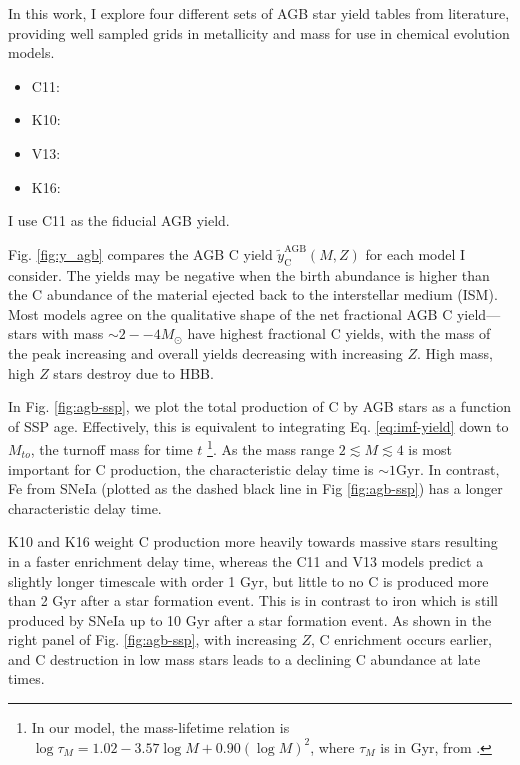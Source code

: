 \documentclass[12pt,oneside]{report}
\begin{document}
In this work, I explore four different sets of AGB star yield tables from literature, providing well sampled grids in metallicity and mass for use in chemical evolution models. 
\begin{itemize}
    \item C11: \citet{cristallo+11, cristallo+15}
    \item K10: \citet{karakas10}
    \item V13: \citet{ventura+13,ventura+14,ventura+18}
    \item K16: \citet{KL16} \citet{karakas+18}
\end{itemize}
I use C11 as the fiducial AGB yield.


Fig. \ref{fig:y_agb} compares the AGB C yield $\tilde{y}_\text{C}^\text{AGB}(M, Z)$ for each model I consider. 
The yields may be negative when the birth abundance is higher than the C abundance of the material ejected back to the interstellar medium (ISM). 
Most models agree on the qualitative shape of the net fractional AGB C yield---%
stars with mass $\sim 2--4 M_\odot$ have highest fractional C yields, with the mass of the peak increasing and overall yields decreasing with increasing $Z$.  High mass, high $Z$ stars destroy  due to HBB.

In Fig. \ref{fig:agb-ssp}, we plot the total production of C by AGB stars as a function of SSP age.
Effectively, this is equivalent to integrating Eq. \ref{eq:imf-yield} down to $M_{to}$, the turnoff mass for time $t$%
\footnote{In our model, the mass-lifetime relation is
$\log \tau_M = 1.02 - 3.57\log M + 0.90 \left(\log M\right)^2$,
where $\tau_M$ is in Gyr,
from \citet{larson74}.}.
As the mass range $2\lesssim M \lesssim 4$ is most important for C production, the characteristic delay time is $\sim 1$Gyr. In contrast, Fe from SNeIa (plotted as the dashed black line in Fig \ref{fig:agb-ssp}) has a longer characteristic delay time.

K10 and K16 weight C production more heavily towards massive stars resulting in a faster enrichment delay time, whereas the C11 and V13 models predict a slightly longer timescale with order 1 Gyr, but little to no C is produced more than 2 Gyr after a star formation event. This is in contrast to iron which is still produced by SNeIa up to 10 Gyr after a star formation event. 
As shown in the right panel of Fig. \ref{fig:agb-ssp}, with increasing $Z$, C enrichment occurs earlier, and C destruction in low mass stars leads to a declining C abundance at late times.
    
\end{document}
